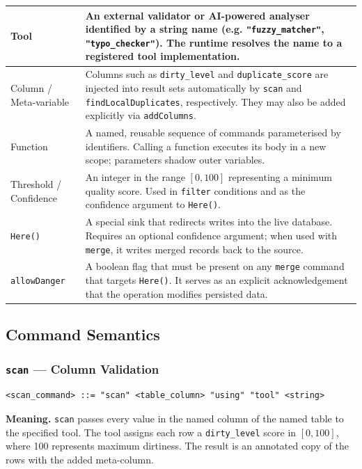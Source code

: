 \begin{itemize}[label=-, noitemsep]
\begin{itemize}[label=-, noitemsep]
\begin{table}[H]
\begin{tabular}{|p{3cm}|p{10cm}|}
Tool &
An external validator or AI-powered analyser identified by a string name (e.g. \texttt{"fuzzy\_matcher"}, \texttt{"typo\_checker"}). The runtime resolves the name to a registered tool implementation. \\
\hline

Column / Meta-variable &
Columns such as \texttt{dirty\_level} and \texttt{duplicate\_score} are injected into result sets automatically by \texttt{scan} and \texttt{findLocalDuplicates}, respectively. They may also be added explicitly via \texttt{addColumns}. \\
\hline

Function &
A named, reusable sequence of commands parameterised by identifiers. Calling a function executes its body in a new scope; parameters shadow outer variables. \\
\hline

Threshold / Confidence &
An integer in the range $[0,100]$ representing a minimum quality score. Used in \texttt{filter} conditions and as the confidence argument to \texttt{Here()}. \\
\hline

\texttt{Here()} &
A special sink that redirects writes into the live database. Requires an optional confidence argument; when used with \texttt{merge}, it writes merged records back to the source. \\
\hline

\texttt{allowDanger} &
A boolean flag that must be present on any \texttt{merge} command that targets \texttt{Here()}. It serves as an explicit acknowledgement that the operation modifies persisted data. \\
\hline
\end{tabular}
\end{table}

\subsection{Command Semantics}

\subsubsection{\texttt{scan} --- Column Validation}

\begin{lstlisting}[style=bnf]
<scan_command> ::= "scan" <table_column> "using" "tool" <string>
\end{lstlisting}

\textbf{Meaning.} \texttt{scan} passes every value in the named column of the
named table to the specified tool. The tool assigns each row a
\texttt{dirty\_level} score in $[0, 100]$, where 100 represents maximum
dirtiness. The result is an annotated copy of the rows with the added
meta-column.


\end{itemize}
\end{itemize}
